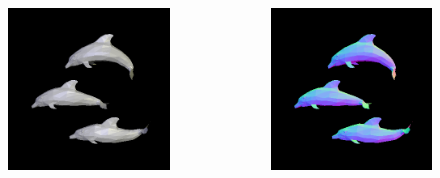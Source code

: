 \documentclass{beamer}
\begin{document}
\begin{frame}
	\begin{columns}[T]
		\begin{column}{.45\textwidth}
			\begin{figure}
				\includegraphics[width=\textwidth]{dolphins-correct}
			\end{figure}
		\end{column}
		\begin{column}{.45\textwidth}
			\begin{figure}
				\includegraphics[width=\textwidth]{dolphins-normal-correct}
			\end{figure}
		\end{column}
	\end{columns}
\end{frame}
\end{document}
